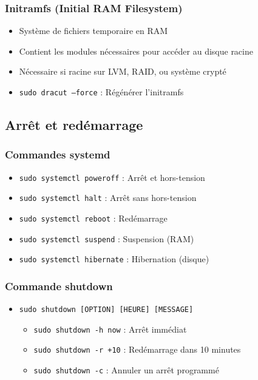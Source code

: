 \documentclass[12pt,a4paper]{article}
\begin{document}
\subsubsection{Initramfs (Initial RAM Filesystem)}
\begin{itemize}
    \item Système de fichiers temporaire en RAM
    \item Contient les modules nécessaires pour accéder au disque racine
    \item Nécessaire si racine sur LVM, RAID, ou système crypté
    \item \texttt{sudo dracut --force} : Régénérer l'initramfs
\end{itemize}

\subsection{Arrêt et redémarrage}

\subsubsection{Commandes systemd}
\begin{itemize}
    \item \texttt{sudo systemctl poweroff} : Arrêt et hors-tension
    \item \texttt{sudo systemctl halt} : Arrêt sans hors-tension
    \item \texttt{sudo systemctl reboot} : Redémarrage
    \item \texttt{sudo systemctl suspend} : Suspension (RAM)
    \item \texttt{sudo systemctl hibernate} : Hibernation (disque)
\end{itemize}

\subsubsection{Commande shutdown}
\begin{itemize}
    \item \texttt{sudo shutdown [OPTION] [HEURE] [MESSAGE]}
    \begin{itemize}
        \item \texttt{sudo shutdown -h now} : Arrêt immédiat
        \item \texttt{sudo shutdown -r +10} : Redémarrage dans 10 minutes
        \item \texttt{sudo shutdown -c} : Annuler un arrêt programmé
    \end{itemize}
\end{itemize}
\end{document}
